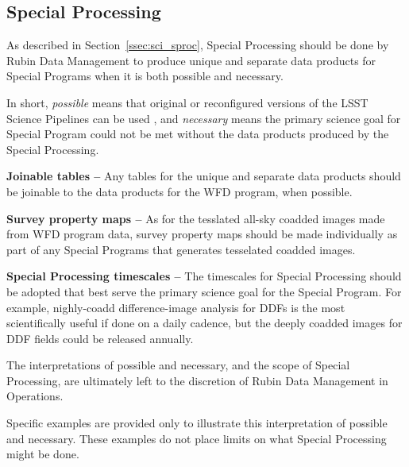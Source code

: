 \subsection{Special Processing}\label{ssec:proc_special}

As described in Section~\ref{ssec:sci_sproc}, 
Special Processing should be done by Rubin Data Management to 
produce unique and separate data products
for Special Programs when it is both possible and necessary.

In short, \emph{possible} means that original or reconfigured versions of the LSST
Science Pipelines can be used , and \emph{necessary} means the primary science goal for Special Program
could not be met without the data products produced by the Special Processing.

\textbf{Joinable tables --}
Any tables for the unique and separate data products should be joinable to the 
data products for the WFD program, when possible.

\textbf{Survey property maps --}
As for the tesslated all-sky coadded images made from WFD program data, survey property maps
should be made individually as part of any Special Programs that generates
tesselated coadded images.

\textbf{Special Processing timescales --}
The timescales for Special Processing should be adopted that best serve the
primary science goal for the Special Program.
For example, nighly-coadd difference-image analysis for DDFs is the most
scientifically useful if done on a daily cadence, but the deeply coadded
images for DDF fields could be released annually.

The interpretations of possible and necessary, and the scope of Special Processing,
are ultimately left to the discretion of Rubin Data Management in Operations.

Specific examples are provided only to illustrate this interpretation of possible and necessary.
These examples do not place limits on what Special Processing might be done.

